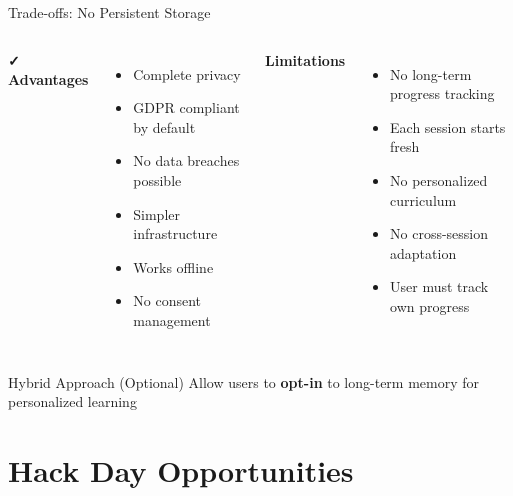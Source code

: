 \documentclass[aspectratio=169]{beamer}
\begin{document}
\begin{frame}{Trade-offs: No Persistent Storage}
\begin{columns}[T]
\textbf{\textcolor{kivagreen}{\faCheck{} Advantages}}
\begin{itemize}
    \item Complete privacy
    \item GDPR compliant by default
    \item No data breaches possible
    \item Simpler infrastructure
    \item Works offline
    \item No consent management
\end{itemize}

\textbf{\textcolor{kivared}{\faTimes{} Limitations}}
\begin{itemize}
    \item No long-term progress tracking
    \item Each session starts fresh
    \item No personalized curriculum
    \item No cross-session adaptation
    \item User must track own progress
\end{itemize}
\end{columns}

\vspace{0.3cm}

\begin{block}{Hybrid Approach (Optional)}
Allow users to \textbf{opt-in} to long-term memory for personalized learning
\end{block}
\end{frame}

\section{Hack Day Opportunities}
\end{document}
